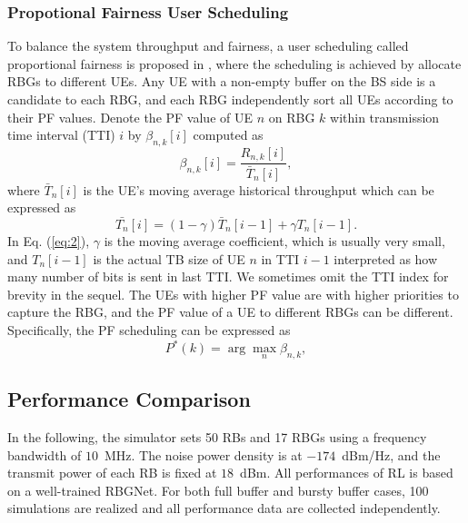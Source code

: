 \documentclass[conference,compsocconf]{IEEEtran}
\begin{document}
\subsubsection{Propotional Fairness User Scheduling}
To balance the system throughput and fairness, a user scheduling called proportional fairness is proposed in \cite{tse2001multiuser}, where the scheduling is achieved by allocate RBGs to different UEs. Any UE with a non-empty buffer on the BS side is a candidate to each RBG, and each RBG independently sort all UEs according to their PF values. Denote the PF value of UE $n$ on RBG $k$ within transmission time interval (TTI) $i$ by $\beta_{n,k}[i]$ computed as
\begin{equation}
\beta_{n,k}[i]=\frac{R_{n,k}[i]}{\bar{T}_n[i]},
\label{eq1}
\end{equation}
where $\bar{T}_n[i]$ is the UE's moving average historical throughput which can be expressed as
\begin{equation}
\bar{T_n}[i]=\left(1-\gamma\right)\bar{T}_n[i-1]+\gamma T_n[i-1].
\label{eq:2}
\end{equation}
In Eq. (\ref{eq:2}), $\gamma$ is the moving average coefficient, which is usually very small, and $T_n[i-1]$ is the actual TB size of UE $n$ in TTI $i-1$ interpreted as how many number of bits is sent in last TTI. We sometimes omit the TTI index for brevity in the sequel. The UEs with higher PF value are with higher priorities to capture the RBG, and the PF value of a UE to different RBGs can be different. Specifically, the PF scheduling can be expressed as
\begin{equation}
P^*(k)=\arg\mathop{\max}_{n}\beta_{n,k},
\end{equation} 


\subsection{Performance Comparison}
In the following, the simulator sets 50 RBs and 17 RBGs using a frequency bandwidth of $10$~MHz. The noise power density is at $-174$~dBm/Hz, and the transmit power of each RB is fixed at $18$~dBm. All performances of RL is based on a well-trained RBGNet. For both full buffer and bursty buffer cases, 100 simulations are realized and all performance data are collected independently.
\end{document}
